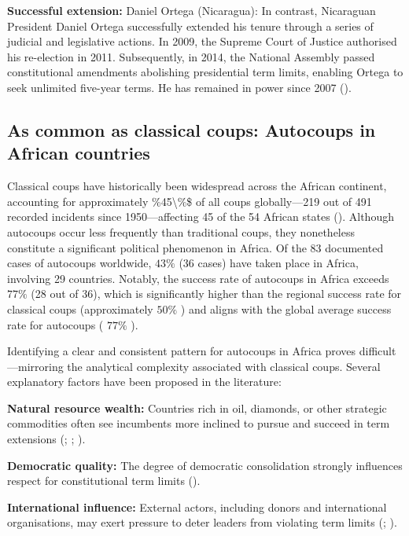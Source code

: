 \documentclass[
  12pt,
]{report}
\begin{document}
\textbf{Successful extension:} Daniel Ortega (Nicaragua): In contrast,
Nicaraguan President Daniel Ortega successfully extended his tenure
through a series of judicial and legislative actions. In 2009, the
Supreme Court of Justice authorised his re-election in 2011.
Subsequently, in 2014, the National Assembly passed constitutional
amendments abolishing presidential term limits, enabling Ortega to seek
unlimited five-year terms. He has remained in power since 2007
().

\subsection{As common as classical coups: Autocoups in African
countries}\label{as-common-as-classical-coups-autocoups-in-african-countries}

Classical coups have historically been widespread across the African
continent, accounting for approximately \%45\textbackslash\%\$ of all
coups globally---219 out of 491 recorded incidents since
1950---affecting 45 of the 54 African states
(). Although autocoups
occur less frequently than traditional coups, they nonetheless
constitute a significant political phenomenon in Africa. Of the 83
documented cases of autocoups worldwide, \(43\%\) (36 cases) have taken
place in Africa, involving 29 countries. Notably, the success rate of
autocoups in Africa exceeds \(77\%\) (28 out of 36), which is
significantly higher than the regional success rate for classical coups
(approximately \(50\%\) ) and aligns with the global average success
rate for autocoups ( \(77\%\) ).

Identifying a clear and consistent pattern for autocoups in Africa
proves difficult---mirroring the analytical complexity associated with
classical coups. Several explanatory factors have been proposed in the
literature:

\textbf{Natural resource wealth:} Countries rich in oil, diamonds, or
other strategic commodities often see incumbents more inclined to pursue
and succeed in term extensions (; ;
).

\textbf{Democratic quality:} The degree of democratic consolidation
strongly influences respect for constitutional term limits
().

\textbf{International influence:} External actors, including donors and
international organisations, may exert pressure to deter leaders from
violating term limits (;
).
\end{document}
